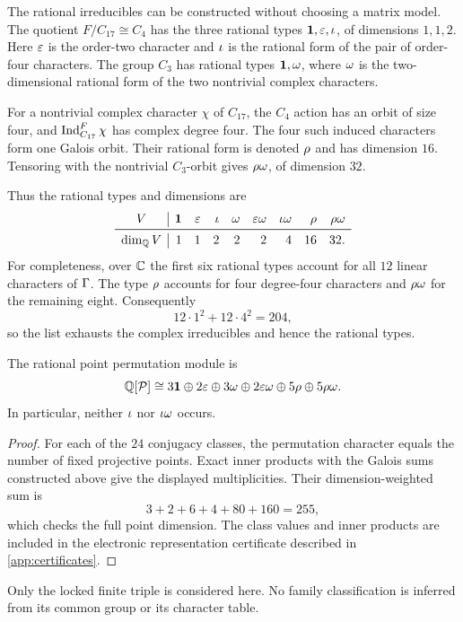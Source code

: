 The rational irreducibles can be constructed without choosing a matrix
model.  The quotient \(F/C_{17}\cong C_4\) has the three rational types
\(\mathbf1,\varepsilon,\iota\), of dimensions \(1,1,2\).  Here \(\varepsilon\) is the
order-two character and \(\iota\) is the rational form of the pair of
order-four characters.  The group \(C_3\) has rational types
\(\mathbf1,\omega\), where \(\omega\) is the two-dimensional rational form of
the two nontrivial complex characters.

For a nontrivial complex character \(\chi\) of \(C_{17}\), the \(C_4\)
action has an orbit of size four, and
\(\operatorname{Ind}_{C_{17}}^F\chi\) has complex degree four.  The four such induced
characters form one Galois orbit.  Their rational form is denoted
\(\rho\) and has dimension \(16\).  Tensoring with the nontrivial
\(C_3\)-orbit gives \(\rho\omega\), of dimension \(32\).

Thus the rational types and dimensions are
\[
\begin{array}{c|rrrrrrrr}
V&\mathbf1&\eps&\iot&\om&\eps\om&\iot\om&\rh&\rh\om\\
\midrule
\dim_{\QQ}V&1&1&2&2&2&4&16&32.
\end{array}
\]
For completeness, over \(\mathbb C\) the first six rational types account for
all \(12\) linear characters of \(\Gamma\).  The type \(\rho\) accounts
for four degree-four characters and \(\rho\omega\) for the remaining eight.
Consequently
\[
 12\cdot1^2+12\cdot4^2=204,
\]
so the list exhausts the complex irreducibles and hence the rational
types.

\begin{proposition}
\label{prop:point-module}
The rational point permutation module is
\[
\mathbb Q[\mathcal P]\cong
3\mathbf1\oplus2\varepsilon\oplus3\omega\oplus2\varepsilon\omega
\oplus5\rho\oplus5\rho\omega.
\]
In particular, neither \(\iota\) nor \(\iota\omega\) occurs.
\end{proposition}

\begin{proof}
For each of the \(24\) conjugacy classes, the permutation character equals
the number of fixed projective points.  Exact inner products with the
Galois sums constructed above give the displayed multiplicities.  Their
dimension-weighted sum is
\[
3+2+6+4+80+160=255,
\]
which checks the full point dimension.  The class values and inner
products are included in the electronic representation certificate
described in \cref{app:certificates}.
\end{proof}

\begin{remark}
Only the locked finite triple is considered here.  No family
classification is inferred from its common group or its character table.
\end{remark}

